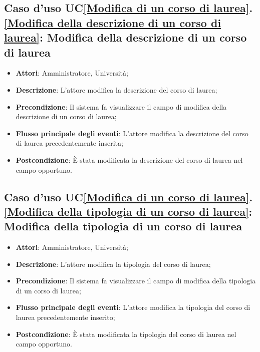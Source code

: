 \subsection{Caso d'uso UC\ref{Modifica di un corso di laurea}.\ref{Modifica della descrizione di un corso di laurea}: Modifica della descrizione di un corso di laurea}
\begin{itemize}
	\item \textbf{Attori}: Amministratore, Università;
	\item \textbf{Descrizione}: L'attore modifica la descrizione del corso di laurea;
	
	\item \textbf{Precondizione}: Il sistema fa visualizzare il campo di modifica della descrizione di un corso di laurea;
	
	\item \textbf{Flusso principale degli eventi}: L'attore modifica la descrizione del corso di laurea precedentemente inserita;
	
	\item \textbf{Postcondizione}: È stata modificata la descrizione del corso di laurea nel campo opportuno.
	
\end{itemize}

\subsection{Caso d'uso UC\ref{Modifica di un corso di laurea}.\ref{Modifica della tipologia di un corso di laurea}: Modifica della tipologia di un corso di laurea}
\begin{itemize}
	\item \textbf{Attori}: Amministratore, Università;
	\item \textbf{Descrizione}: L'attore modifica la tipologia del corso di laurea;
	
	\item \textbf{Precondizione}: Il sistema fa visualizzare il campo di modifica della tipologia di un corso di laurea;
	
	\item \textbf{Flusso principale degli eventi}: L'attore modifica la tipologia del corso di laurea precedentemente inserito;
	
	\item \textbf{Postcondizione}: È stata modificata la tipologia del corso di laurea nel campo opportuno.
	
\end{itemize}

